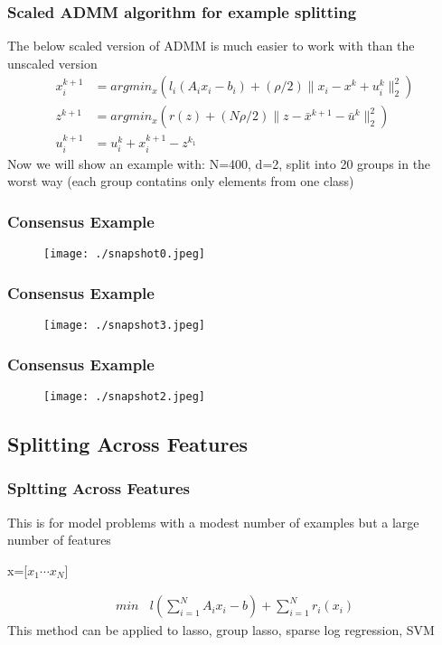 \documentclass{beamer}
\begin{document}
\begin{frame}
  \frametitle{Scaled ADMM algorithm for example splitting}
  The below scaled version of ADMM is much easier to work with than the unscaled version
  \begin{align}
    x_{i}^{k+1} &= argmin_{x} \left( l_{i}(A_{i}x_{i} - b_{i}) + (\rho/2) \| x_{i} - x^{k} + u_{i}^{k} \|_{2}^{2}  \right) \\
    z^{k+1} &= argmin_{x} \left( r(z) + (N\rho/2)\| z - \bar{x}^{k+1} - \bar{u}^{k}  \|_{2}^{2}  \right)\\
    u_{i}^{k+1} &= u_{i}^{k} + x_{i}^{k+1} - z^{k_1}
  \end{align}
Now we will show an example with: N=400, d=2, split into 20 groups in the worst way (each group contatins only elements from one class)
\end{frame}

\begin{frame}
  \frametitle{Consensus Example}

  \begin{figure}[]
    \centering
    \texttt{[image: ./snapshot0.jpeg]}
  \end{figure}
\end{frame}


\begin{frame}
  \frametitle{Consensus Example}
  \begin{figure}[]
    \centering
    \texttt{[image: ./snapshot3.jpeg]}
  \end{figure}
\end{frame}

\begin{frame}
  \frametitle{Consensus Example}
  \begin{figure}[]
    \centering
    \texttt{[image: ./snapshot2.jpeg]}
  \end{figure}
\end{frame}
\subsection{Splitting Across Features}

\begin{frame}
  \frametitle{Spltting Across Features}
  This is for model problems with a modest number of examples but a large number of features \\
  \begin{center}
	x=[$x_{1} \cdots x_{N}$]
  \end{center}
	\begin{align}
	  min \: \: \: \: l(\sum_{i=1}^{N} A_{i}x_{i} - b) + \sum_{i=1}^{N} r_{i}(x_{i})
	  \label{}
	\end{align}
	This method can be applied to lasso, group lasso, sparse log regression, SVM
\end{frame}
\end{document}
